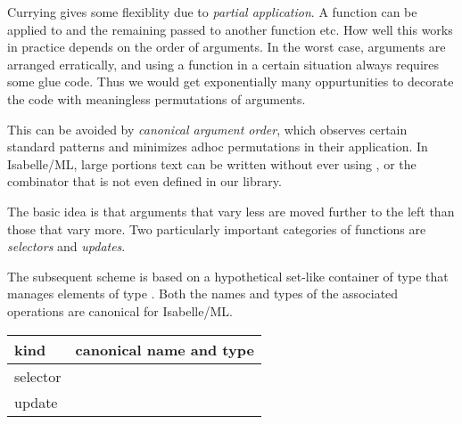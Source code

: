\begin{isabellebody}
\begin{isamarkuptext}
  Currying gives some flexiblity due to \emph{partial application}.  A
  function  can be applied to 
  and the remaining  passed to another function
  etc.  How well this works in practice depends on the order of
  arguments.  In the worst case, arguments are arranged erratically,
  and using a function in a certain situation always requires some
  glue code.  Thus we would get exponentially many oppurtunities to
  decorate the code with meaningless permutations of arguments.

  This can be avoided by \emph{canonical argument order}, which
  observes certain standard patterns and minimizes adhoc permutations
  in their application.  In Isabelle/ML, large portions text can be
  written without ever using , or the
  combinator  that is not even
  defined in our library.

  \medskip The basic idea is that arguments that vary less are moved
  further to the left than those that vary more.  Two particularly
  important categories of functions are \emph{selectors} and
  \emph{updates}.

  The subsequent scheme is based on a hypothetical set-like container
  of type \isa{{\isasymbeta}} that manages elements of type \isa{{\isasymalpha}}.  Both
  the names and types of the associated operations are canonical for
  Isabelle/ML.

  \medskip
  \begin{tabular}{ll}
  kind & canonical name and type \\\hline
  selector & \isa{member{\isacharcolon}\ {\isasymbeta}\ {\isasymrightarrow}\ {\isasymalpha}\ {\isasymrightarrow}\ bool} \\
  update & \isa{insert{\isacharcolon}\ {\isasymalpha}\ {\isasymrightarrow}\ {\isasymbeta}\ {\isasymrightarrow}\ {\isasymbeta}} \\
  \end{tabular}
  \medskip


\end{isamarkuptext}
\end{isabellebody}
